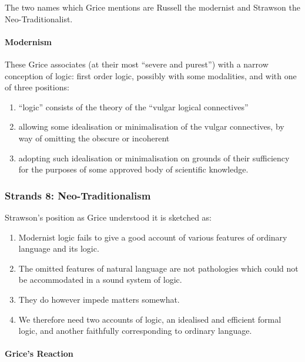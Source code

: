 \documentclass[10pt,titlepage]{book}
\begin{document}
The two names which Grice mentions are Russell the modernist and Strawson the Neo-Traditionalist.

\paragraph{Modernism}

These Grice associates (at their most ``severe and purest'') with a narrow conception of logic: first order logic, possibly with some modalities, and with one of three positions:

\begin{enumerate}
\item ``logic'' consists of the theory of the ``vulgar logical connectives''

\item allowing some idealisation or minimalisation of the vulgar connectives, by way of omitting the obscure or incoherent

\item adopting such idealisation or minimalisation on grounds of their sufficiency for the purposes of some approved body of scientific knowledge.
\end{enumerate}

\subsubsection{Strands 8: Neo-Traditionalism}

Strawson's position as Grice understood it is sketched as:

\begin{enumerate}

\item Modernist logic fails to give a good account of various features of ordinary language and its logic.

\item The omitted features of natural language are not pathologies which could not be accommodated in a sound system of logic.

\item They do however impede matters somewhat.

\item We therefore need two accounts of logic, an idealised and efficient formal logic, and another faithfully corresponding to ordinary language. 

\end{enumerate}

\paragraph{Grice's Reaction}
\end{document}
